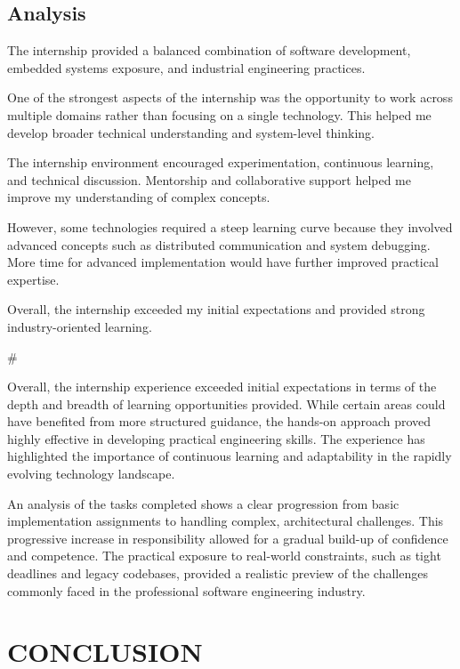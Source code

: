 \documentclass[12pt,a4paper]{report}
\begin{document}
\section{Analysis}

The internship provided a balanced combination of software development, embedded systems exposure, and industrial engineering practices.


One of the strongest aspects of the internship was the opportunity to work across multiple domains rather than focusing on a single technology. This helped me develop broader technical understanding and system-level thinking.


The internship environment encouraged experimentation, continuous learning, and technical discussion. Mentorship and collaborative support helped me improve my understanding of complex concepts.


However, some technologies required a steep learning curve because they involved advanced concepts such as distributed communication and system debugging. More time for advanced implementation would have further improved practical expertise.


Overall, the internship exceeded my initial expectations and provided strong industry-oriented learning.


\#


Overall, the internship experience exceeded initial expectations in terms of the depth and breadth of learning opportunities provided. While certain areas could have benefited from more structured guidance, the hands-on approach proved highly effective in developing practical engineering skills. The experience has highlighted the importance of continuous learning and adaptability in the rapidly evolving technology landscape.


An analysis of the tasks completed shows a clear progression from basic implementation assignments to handling complex, architectural challenges. This progressive increase in responsibility allowed for a gradual build-up of confidence and competence. The practical exposure to real-world constraints, such as tight deadlines and legacy codebases, provided a realistic preview of the challenges commonly faced in the professional software engineering industry.




\chapter{CONCLUSION}
\label{ch:conclusion}
\end{document}
